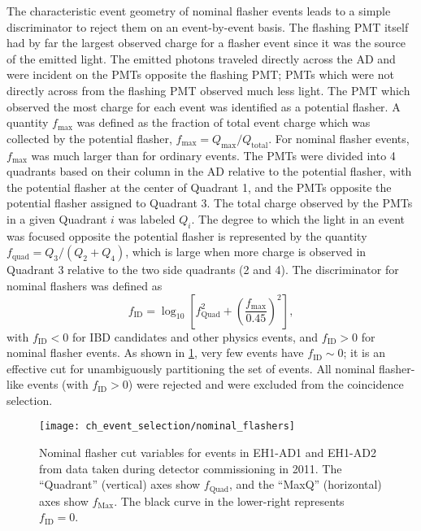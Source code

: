 The characteristic event geometry of nominal flasher events
leads to a simple discriminator to reject them on an event-by-event basis.
The flashing PMT itself had by far the largest observed charge
for a flasher event since it was the source of the emitted light.
The emitted photons traveled directly across the AD
and were incident on the PMTs opposite the flashing PMT;
PMTs which were not directly across from the flashing PMT
observed much less light.
The PMT which observed the most charge for each event
was identified as a potential flasher.
A quantity $f_{\text{max}}$ was defined as the fraction of total event charge
which was collected by the potential flasher,
$f_{\text{max}} = Q_{\text{max}}/Q_{\text{total}}$.
For nominal flasher events, $f_{\text{max}}$ was much larger than for ordinary events.
The PMTs were divided into 4 quadrants based on their column in the AD
relative to the potential flasher,
with the potential flasher at the center of Quadrant 1,
and the PMTs opposite the potential flasher assigned to Quadrant 3.
The total charge observed by the PMTs in a given Quadrant $i$
was labeled $Q_i$.
The degree to which the light in an event was focused
opposite the potential flasher
is represented by the quantity $f_{\text{quad}} = Q_3/(Q_2 + Q_4)$,
which is large when more charge is observed in Quadrant 3
relative to the two side quadrants (2 and 4).
The discriminator for nominal flashers was defined as
\begin{equation}
    f_{\text{ID}} = \log_{10}\left[
        f_{\text{Quad}}^2 + \left(
            \frac{f_{\text{max}}}{0.45}
        \right)^2
    \right],
\end{equation}
with $f_{\text{ID}} < 0$ for IBD candidates and other physics events,
and $f_{\text{ID}} > 0$ for nominal flasher events.
As shown in \cref{fig:flasher_nominal_cut},
very few events have $f_{\text{ID}}\sim0$;
it is an effective cut for unambiguously partitioning the set of events.
All nominal flasher-like events (with $f_{\text{ID}} > 0$) were rejected
and were excluded from the coincidence selection.

\begin{figure}
    \centering
    \texttt{[image: ch\_event\_selection/nominal\_flashers]}
    \caption[Nominal flasher cut variables]{
        Nominal flasher cut variables for events in EH1-AD1 and EH1-AD2
        from data taken during detector commissioning in 2011.
        The ``Quadrant'' (vertical) axes show $f_\text{Quad}$,
        and the ``MaxQ'' (horizontal) axes show $f_\text{Max}$.
        The black curve in the lower-right represents $f_\text{ID} = 0$.
    }
    \label{fig:flasher_nominal_cut}
\end{figure}

